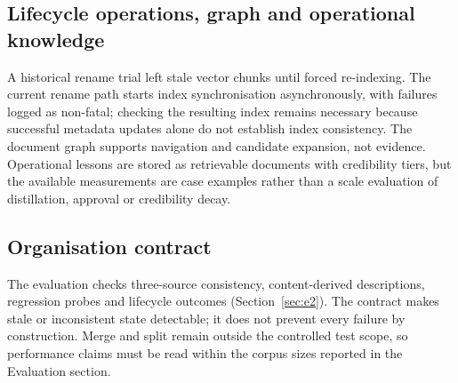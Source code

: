 \subsection{Lifecycle operations, graph and operational knowledge}
\label{sec:org-lifecycle}
\label{sec:org-graph}
\label{sec:org-experience}

A historical rename trial left stale vector chunks until forced re-indexing.
The current rename path starts index synchronisation asynchronously, with
failures logged as non-fatal; checking the resulting index remains necessary
because successful metadata updates alone do not establish index consistency. The document graph supports navigation and candidate
expansion, not evidence. Operational lessons are stored as retrievable
documents with credibility tiers, but the available measurements are case
examples rather than a scale evaluation of distillation, approval or
credibility decay.

\subsection{Organisation contract}
\label{sec:org-integrity}
\label{sec:org-summary}

The evaluation checks three-source consistency, content-derived descriptions,
regression probes and lifecycle outcomes (Section~\ref{sec:e2}). The contract
makes stale or inconsistent state detectable; it does not prevent every
failure by construction. Merge and split remain outside the controlled test
scope, so performance claims must be read within the corpus sizes reported in
the Evaluation section.
